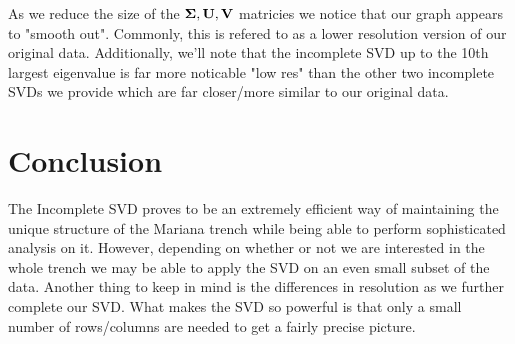 \documentclass[letterpaper,12pt]{article}
\begin{document}
As we reduce the size of the \(\vb{\Sigma}, \vb{U}, \vb{V}\) matricies we notice that our graph appears to "smooth out". 
Commonly, this is refered to as a lower resolution version of our original data.
Additionally, we'll note that the incomplete SVD up to the 10th largest eigenvalue is far more noticable "low res" than the other two incomplete SVDs we provide which are far closer/more similar to our original data.
\section{Conclusion}
The Incomplete SVD proves to be an extremely efficient way of maintaining the unique structure of the Mariana trench while being able to perform sophisticated analysis on it. However, depending on whether or not we are interested in the whole trench we may be able to apply the SVD on an even small subset of the data. Another thing to keep in mind is the differences in resolution as we further complete our SVD. What makes the SVD so powerful is that only a small number of rows/columns are needed to get a fairly precise picture.
\pagebreak
\end{document}
